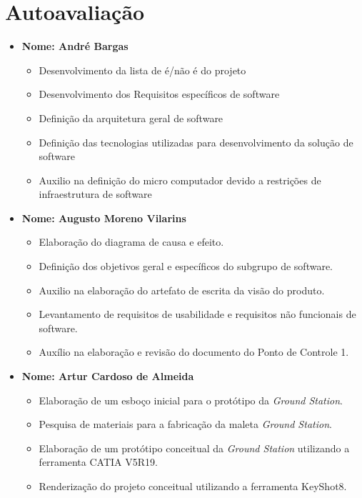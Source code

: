 \chapter[Autoavaliação]{Autoavaliação}
\label{autoavaliacao}

\begin{itemize}

    
        \item \textbf{Nome: André Bargas}
    \begin{itemize}
   		 \item Desenvolvimento da lista de é/não é do projeto
   		 \item Desenvolvimento dos Requisitos específicos de software
   		 \item Definição da arquitetura geral de software
         \item Definição das tecnologias utilizadas para desenvolvimento da solução de software
   		 \item Auxilio na definição do micro computador devido a restrições de infraestrutura de software
   		 
    \end{itemize}
    
        \item \textbf{Nome: Augusto Moreno Vilarins}
    \begin{itemize}
        \item  Elaboração do diagrama de causa e efeito.
        \item  Definição dos objetivos geral e específicos do subgrupo de software.
        \item Auxilio na elaboração do artefato de escrita da visão do produto.
        \item Levantamento de requisitos de usabilidade e requisitos não funcionais de software.
        \item Auxílio na elaboração e revisão do documento do Ponto de Controle 1.
    \end{itemize}
    
    
    \item \textbf{Nome: Artur Cardoso de Almeida}
    \begin{itemize}
        \item Elaboração de um esboço inicial para o protótipo da \textit{Ground Station}.
        \item Pesquisa de materiais para a fabricação da maleta \textit{Ground Station}.
        \item Elaboração de um protótipo conceitual da \textit{Ground Station} utilizando a ferramenta CATIA V5R19.
        \item Renderização do projeto conceitual utilizando a ferramenta KeyShot8.
    \end{itemize}



\end{itemize}
